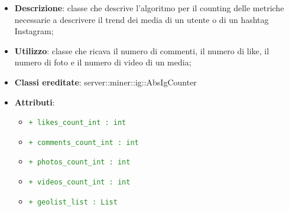 			\begin{itemize}
				\item \textbf{Descrizione}: classe che descrive l'algoritmo per il counting delle metriche necessarie a descrivere il trend dei media di un utente o di un hashtag  Instagram;
				\item \textbf{Utilizzo}: classe che ricava il numero di commenti, il numero di like, il numero di foto e il numero di video di un media;
				\item \textbf{Classi ereditate}: server::miner::ig::AbsIgCounter
				\item \textbf{Attributi}:    
					\begin{itemize}
						\item \textcolor{forestgreen}{\texttt{+ likes\_count\_int : int}}
						\item \textcolor{forestgreen}{\texttt{+ comments\_count\_int : int}}
						\item \textcolor{forestgreen}{\texttt{+ photos\_count\_int : int}}
						\item \textcolor{forestgreen}{\texttt{+ videos\_count\_int : int}}
						\item \textcolor{forestgreen}{\texttt{+ geolist\_list : List}}

\end{itemize}
\end{itemize}
